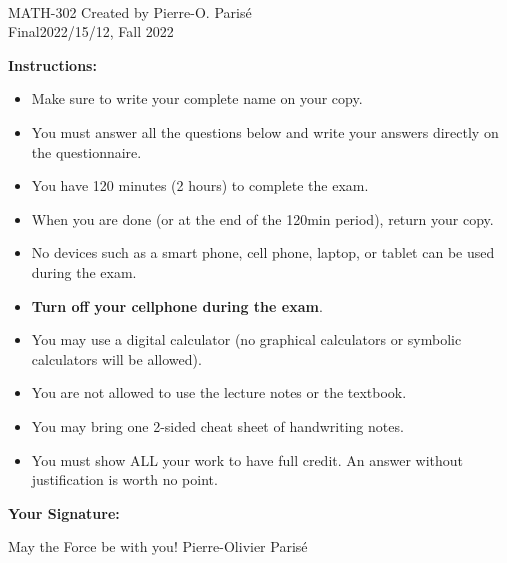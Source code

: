 \documentclass[addpoints, 12pt]{exam}%
\theoremstyle{definition}
\begin{document}
	\noindent \hrulefill \\
	\noindent MATH-302 \hfill Created by Pierre-O. Paris{\'e}\\
	Final\hfill 2022/15/12, Fall 2022\\\vspace*{-0.7cm}

\noindent\hrulefill
	
\vspace*{1cm}

\noindent{}

\vspace*{1cm}

\vspace*{1cm}

\noindent\textbf{Instructions:} 

\begin{itemize}
\item Make sure to write your complete name on your copy. 
\item You must answer all the questions below and write your answers directly on the questionnaire.
\item You have 120 minutes (2 hours) to complete the exam.
\item When you are done (or at the end of the 120min period), return your copy. 
\item No devices such as a smart phone, cell phone, laptop, or tablet can be used during the exam. 
\item \textbf{Turn off your cellphone during the exam}.
\item You may use a digital calculator (no graphical calculators or symbolic calculators will be allowed).
\item You are not allowed to use the lecture notes or the textbook.
\item You may bring one 2-sided cheat sheet of handwriting notes. 
\item You must show ALL your work to have full credit. An answer without justification is worth no point.
\end{itemize}

\vspace{0.5cm}

\noindent\textbf{Your Signature:} \hrulefill

\vspace*{2cm}
\noindent May the Force be with you! \hfill Pierre-Olivier Parisé
\end{document}
